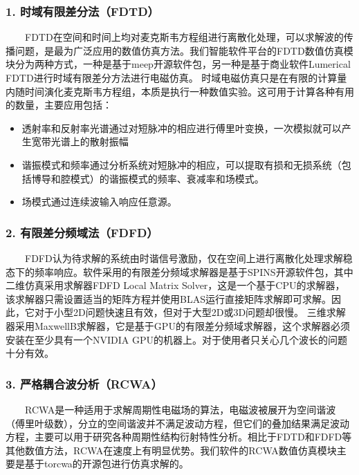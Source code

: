 \documentclass[letterpaper,10pt,english]{sphinxmanual}
\begin{document}
\subsubsection{1. 时域有限差分法（FDTD）}
\label{\detokenize{_u7b80_u4ecb/_u6838_u5fc3_u8bbe_u8ba1_u4f18_u5316_u7b97_u6cd5/_u6570_u503c_u4eff_u771f_u6a21_u5757/_u6570_u503c_u4eff_u771f_u7b97_u6cd5:fdtd}}
\sphinxAtStartPar
  FDTD在空间和时间上均对麦克斯韦方程组进行离散化处理，可以求解波的传播问题，是最为广泛应用的数值仿真方法。我们智能软件平台的FDTD数值仿真模块分为两种方式，一种是基于meep开源软件包，另一种是基于商业软件Lumerical FDTD进行时域有限差分方法进行电磁仿真。
时域电磁仿真只是在有限的计算量内随时间演化麦克斯韦方程组，本质是执行一种数值实验。这可用于计算各种有用的数量，主要应用包括：
\begin{itemize}
\item {} 
\sphinxAtStartPar
透射率和反射率光谱\textendash{}通过对短脉冲的相应进行傅里叶变换，一次模拟就可以产生宽带光谱上的散射振幅

\item {} 
\sphinxAtStartPar
谐振模式和频率\textendash{}通过分析系统对短脉冲的相应，可以提取有损和无损系统（包括博导和腔模式）的谐振模式的频率、衰减率和场模式。

\item {} 
\sphinxAtStartPar
场模式\textendash{}通过连续波输入响应任意源。

\end{itemize}


\subsubsection{2. 有限差分频域法（FDFD）}
\label{\detokenize{_u7b80_u4ecb/_u6838_u5fc3_u8bbe_u8ba1_u4f18_u5316_u7b97_u6cd5/_u6570_u503c_u4eff_u771f_u6a21_u5757/_u6570_u503c_u4eff_u771f_u7b97_u6cd5:fdfd}}
\sphinxAtStartPar
  FDFD认为待求解的系统由时谐信号激励，仅在空间上进行离散化处理求解稳态下的频率响应。软件采用的有限差分频域求解器是基于SPINS开源软件包，其中二维仿真采用求解器FDFD Local Matrix Solver，这是一个基于CPU的求解器，该求解器只需设置适当的矩阵方程并使用BLAS运行直接矩阵求解即可求解。因此，它对于小型2D问题快速且有效，但对于大型2D或3D问题却很慢。
三维求解器采用Maxwell\sphinxhyphen{}B求解器，它是基于GPU的有限差分频域求解器，这个求解器必须安装在至少具有一个NVIDIA GPU的机器上。对于使用者只关心几个波长的问题十分有效。


\subsubsection{3. 严格耦合波分析（RCWA）}
\label{\detokenize{_u7b80_u4ecb/_u6838_u5fc3_u8bbe_u8ba1_u4f18_u5316_u7b97_u6cd5/_u6570_u503c_u4eff_u771f_u6a21_u5757/_u6570_u503c_u4eff_u771f_u7b97_u6cd5:rcwa}}
\sphinxAtStartPar
  RCWA是一种适用于求解周期性电磁场的算法，电磁波被展开为空间谐波（傅里叶级数），分立的空间谐波并不满足波动方程，但它们的叠加结果满足波动方程，主要可以用于研究各种周期性结构衍射特性分析。相比于FDTD和FDFD等其他数值方法，RCWA在速度上有明显优势。我们软件的RCWA数值仿真模块主要是基于torcwa的开源包进行仿真求解的。
\end{document}
